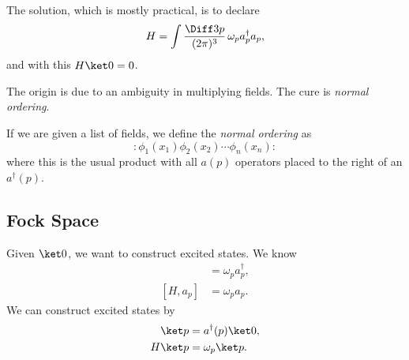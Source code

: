 \documentclass[12pt]{article}
\begin{document}
The solution, which is mostly practical, is to declare
\[
H = \int \frac{\Diff 3 p}{(2 \pi)^3} \, \omega_p a_p^\dagger a_p,
\]
and with this $H \ket 0 = 0$.

The origin is due to an ambiguity in multiplying fields. The cure is \emph{normal ordering}.

\begin{definition}
	If we are given a list of fields, we define the \emph{normal ordering} as
	\[
	: \phi_1(x_1) \phi_2(x_2) \cdots \phi_n(x_n):
	\]
	where this is the usual product with all $a(p)$ operators placed to the right of an $a^\dagger(p)$.
\end{definition}

\subsection{Fock Space}%
\label{sub:fs}

Given $\ket 0$, we want to construct excited states. We know
\begin{align*}
	[H, a_p^\dagger] &= \omega_p a_p^\dagger, \\
	[H, a_p] &= \omega_p a_p.
\end{align*}
We can construct excited states by
\begin{align*}
	\ket p &= a^\dagger(p) \ket 0, \\
	H \ket p &= \omega_p \ket p.
\end{align*}


\newpage

\printindex
\end{document}
